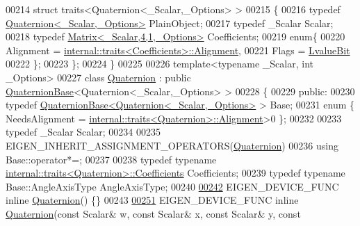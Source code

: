 \begin{DoxyCode}
00214 \textcolor{keyword}{struct }traits<Quaternion<\_Scalar,\_Options> >
00215 \{
00216   \textcolor{keyword}{typedef} \hyperlink{group___geometry___module_class_eigen_1_1_quaternion}{Quaternion<\_Scalar,\_Options>} PlainObject;
00217   \textcolor{keyword}{typedef} \_Scalar Scalar;
00218   \textcolor{keyword}{typedef} \hyperlink{group___core___module_class_eigen_1_1_matrix}{Matrix<\_Scalar,4,1,\_Options>} Coefficients;
00219   \textcolor{keyword}{enum}\{
00220     Alignment = \hyperlink{struct_eigen_1_1internal_1_1traits}{internal::traits<Coefficients>::Alignment},
00221     Flags = \hyperlink{group__flags_gae2c323957f20dfdc6cb8f44428eaec1a}{LvalueBit}
00222   \};
00223 \};
00224 \}
00225 
00226 \textcolor{keyword}{template}<\textcolor{keyword}{typename} \_Scalar, \textcolor{keywordtype}{int} \_Options>
00227 \textcolor{keyword}{class }\hyperlink{group___geometry___module_class_eigen_1_1_quaternion}{Quaternion} : \textcolor{keyword}{public} \hyperlink{group___geometry___module_class_eigen_1_1_quaternion_base}{QuaternionBase}<Quaternion<\_Scalar,\_Options> >
00228 \{
00229 \textcolor{keyword}{public}:
00230   \textcolor{keyword}{typedef} \hyperlink{group___geometry___module_class_eigen_1_1_quaternion_base}{QuaternionBase<Quaternion<\_Scalar,\_Options>} > Base;
00231   \textcolor{keyword}{enum} \{ NeedsAlignment = \hyperlink{struct_eigen_1_1internal_1_1traits}{internal::traits<Quaternion>::Alignment}>0 
      \};
00232 
00233   \textcolor{keyword}{typedef} \_Scalar Scalar;
00234 
00235   EIGEN\_INHERIT\_ASSIGNMENT\_OPERATORS(\hyperlink{group___geometry___module_class_eigen_1_1_quaternion}{Quaternion})
00236   \textcolor{keyword}{using} Base::operator*=;
00237 
00238   \textcolor{keyword}{typedef} \textcolor{keyword}{typename} \hyperlink{struct_eigen_1_1internal_1_1traits}{internal::traits<Quaternion>::Coefficients} 
      Coefficients;
00239   \textcolor{keyword}{typedef} \textcolor{keyword}{typename} Base::AngleAxisType AngleAxisType;
00240 
\hyperlink{group___geometry___module_a7f8e93e2615e56344fd0d89c2916f9be}{00242}   EIGEN\_DEVICE\_FUNC \textcolor{keyword}{inline} \hyperlink{group___geometry___module_a7f8e93e2615e56344fd0d89c2916f9be}{Quaternion}() \{\}
00243 
\hyperlink{group___geometry___module_a90c179492cd3ca296c85815e20773d60}{00251}   EIGEN\_DEVICE\_FUNC \textcolor{keyword}{inline} \hyperlink{group___geometry___module_a90c179492cd3ca296c85815e20773d60}{Quaternion}(\textcolor{keyword}{const} Scalar& w, \textcolor{keyword}{const} Scalar& x, \textcolor{keyword}{const} Scalar& y, \textcolor{keyword}{const} 

\end{DoxyCode}
